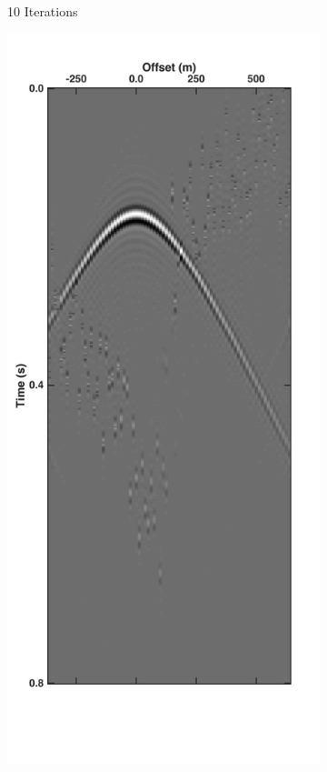 \begin{figure}
\begin{subfigure}[t]{0.25\textwidth}
		\caption{10 Iterations}
		\label{fig:Ch-Theory-DeblendedCRG10}
	\end{subfigure}
	\begin{subfigure}[t]{0.25\textwidth}
		\includegraphics[width=\textwidth]{Plots/Mahdad/15iter/DeblendedCRG_rec30}	

\end{subfigure}
\end{figure}
